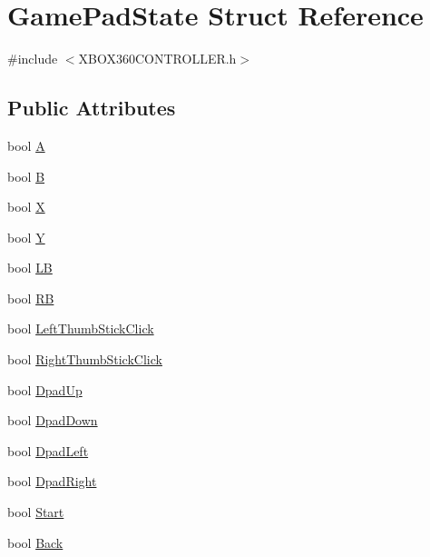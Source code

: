\hypertarget{struct_game_pad_state}{}\section{Game\+Pad\+State Struct Reference}
\label{struct_game_pad_state}


{\ttfamily \#include $<$X\+B\+O\+X360\+C\+O\+N\+T\+R\+O\+L\+L\+E\+R.\+h$>$}

\subsection*{Public Attributes}
\begin{DoxyCompactItemize}
\item 
bool \mbox{\hyperlink{struct_game_pad_state_af86728754942546c867166ee93b5d928}{A}}
\item 
bool \mbox{\hyperlink{struct_game_pad_state_a69af12fbeb269176a48d3dd73fd173ac}{B}}
\item 
bool \mbox{\hyperlink{struct_game_pad_state_ab2e5b135935f6e41ce12fe31099023b9}{X}}
\item 
bool \mbox{\hyperlink{struct_game_pad_state_a5161d220f41ed2c01c79b4d6b0636588}{Y}}
\item 
bool \mbox{\hyperlink{struct_game_pad_state_a9cedca65f74fbd450d71b60e6945ede6}{LB}}
\item 
bool \mbox{\hyperlink{struct_game_pad_state_abd93812ec46832288ba6522f9567a035}{RB}}
\item 
bool \mbox{\hyperlink{struct_game_pad_state_ac297365182f2ac43f06d05e569cf7ec7}{Left\+Thumb\+Stick\+Click}}
\item 
bool \mbox{\hyperlink{struct_game_pad_state_aaedaa16b71acd6076ad96de62dcdfed9}{Right\+Thumb\+Stick\+Click}}
\item 
bool \mbox{\hyperlink{struct_game_pad_state_a5f0c154f7de9283a889f8d0148a73c5f}{Dpad\+Up}}
\item 
bool \mbox{\hyperlink{struct_game_pad_state_a90e5dcace2f9acbfe7bdb5538df995ee}{Dpad\+Down}}
\item 
bool \mbox{\hyperlink{struct_game_pad_state_a1f948f898ad2e9480566220312ba57e9}{Dpad\+Left}}
\item 
bool \mbox{\hyperlink{struct_game_pad_state_a4f492c3548f820fde754578747feea99}{Dpad\+Right}}
\item 
bool \mbox{\hyperlink{struct_game_pad_state_a5f66e4fe59c0ad63855537471276709c}{Start}}
\item 
bool \mbox{\hyperlink{struct_game_pad_state_a7fe1db11128f0565806d87618d530357}{Back}}

\end{DoxyCompactItemize}
